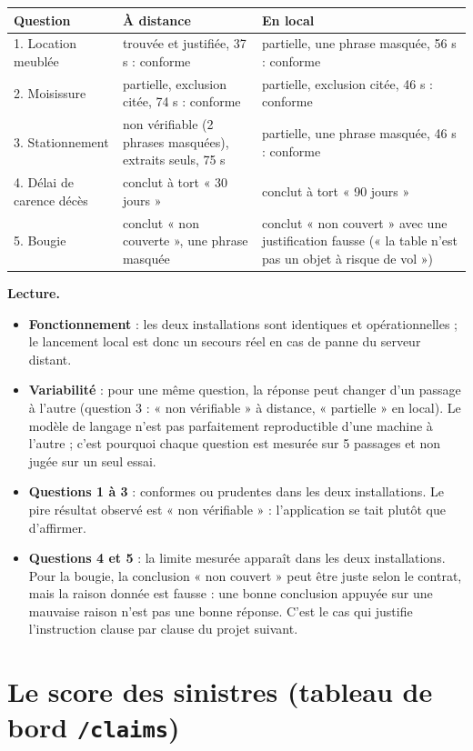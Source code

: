 \documentclass[11pt,a4paper]{article}
\begin{document}
\begin{center}
\small
\begin{tabular}{p{3.2cm}p{5.4cm}p{5.4cm}}
\toprule
Question & À distance & En local \\
\midrule
1. Location meublée & trouvée et justifiée, 37 s : conforme & partielle, une phrase masquée, 56 s : conforme \\
2. Moisissure & partielle, exclusion citée, 74 s : conforme & partielle, exclusion citée, 46 s : conforme \\
3. Stationnement & non vérifiable (2 phrases masquées), extraits seuls, 75 s & partielle, une phrase masquée, 46 s : conforme \\
4. Délai de carence décès & conclut à tort « 30 jours » & conclut à tort « 90 jours » \\
5. Bougie & conclut « non couverte », une phrase masquée & conclut « non couvert » avec une justification fausse (« la table n'est pas un objet à risque de vol ») \\
\bottomrule
\end{tabular}
\end{center}

\textbf{Lecture.}
\begin{itemize}
\item \textbf{Fonctionnement} : les deux installations sont identiques et opérationnelles ; le
lancement local est donc un secours réel en cas de panne du serveur distant.
\item \textbf{Variabilité} : pour une même question, la réponse peut changer d'un passage à
l'autre (question 3 : « non vérifiable » à distance, « partielle » en local). Le modèle de langage
n'est pas parfaitement reproductible d'une machine à l'autre ; c'est pourquoi chaque question est
mesurée sur 5 passages et non jugée sur un seul essai.
\item \textbf{Questions 1 à 3} : conformes ou prudentes dans les deux installations. Le pire
résultat observé est « non vérifiable » : l'application se tait plutôt que d'affirmer.
\item \textbf{Questions 4 et 5} : la limite mesurée apparaît dans les deux installations. Pour la
bougie, la conclusion « non couvert » peut être juste selon le contrat, mais la raison donnée est
fausse : une bonne conclusion appuyée sur une mauvaise raison n'est pas une bonne réponse. C'est
le cas qui justifie l'instruction clause par clause du projet suivant.
\end{itemize}

\section{Le score des sinistres (tableau de bord \texttt{/claims})}
\end{document}
